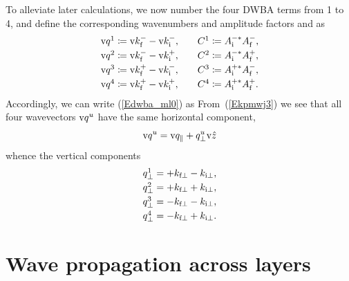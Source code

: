 To alleviate later calculations,
we now number the four DWBA terms from 1 to 4,
and define the corresponding wavenumbers and amplitude factors and as
\begin{equation}
  \begin{array}{l@{\hspace{2em}}l}
    \q^1 \coloneqq  \k^-_\tf - \k^-_\ti,& C^1 \coloneqq  A^{-*}_\ti A^-_\tf, \\[.6ex]
    \q^2 \coloneqq  \k^-_\tf - \k^+_\ti,& C^2 \coloneqq  A^{-*}_\ti A^+_\tf, \\[.6ex]
    \q^3 \coloneqq  \k^+_\tf - \k^-_\ti,& C^3 \coloneqq  A^{+*}_\ti A^-_\tf, \\[.6ex]
    \q^4 \coloneqq  \k^+_\tf - \k^+_\ti,& C^4 \coloneqq  A^{+*}_\ti A^+_\tf.
  \end{array}
\end{equation}
Accordingly, we can write (\ref{Edwba_ml0}) as
From~(\ref{Ekpmwj3}) we see that all four wavevectors $\text{v}{q}^u$
have the same horizontal component,
\begin{equation}\label{Eqpp}
  \text{v}{q}^u = \text{v}{q}_\parallel + q^u_\perp \text{v}{\hat z}
\end{equation}
whence the vertical components
\begin{equation}
    \begin{array}{l}
  q^1_\perp = +k_{\text{f}\perp  } -k_{\text{i}\perp},\\[.6ex]
  q^2_\perp = +k_{\text{f}\perp  } +k_{\text{i}\perp},\\[.6ex]
  q^3_\perp = -k_{\text{f}\perp  } -k_{\text{i}\perp},\\[.6ex]
  q^4_\perp = -k_{\text{f}\perp  } +k_{\text{i}\perp}.
    \end{array}
\end{equation}

\section{Wave propagation across layers}\label{Sacrolay}

%
%
%

